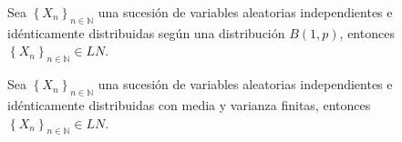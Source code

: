 \begin{teorema}[De Moivre]
Sea $ \left\{X_n\right\}_{n\in\mathbb{N}}$ una sucesi\'on de variables aleatorias independientes e id\'enticamente distribuidas seg\'un una distribuci\'on $B(1,p)$, entonces $\left\{X_n\right\}_{n\in\mathbb{N}}\in LN $.
\end{teorema}
\begin{teorema}
Sea $ \left\{X_n\right\}_{n\in\mathbb{N}}$ una sucesi\'on de variables aleatorias independientes e id\'enticamente distribuidas con media y varianza finitas, entonces $\left\{X_n\right\}_{n\in\mathbb{N}}\in LN $.
\end{teorema}
